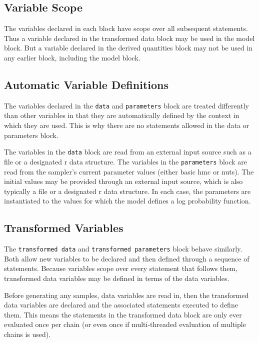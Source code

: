 \documentclass[10pt]{report}
\newcommand{\acronym}[1]{{\sc #1}\xspace}
\newcommand{\R}{\acronym{r}}
\newcommand{\HMC}{\acronym{hmc}}
\newcommand{\NUTS}{\acronym{nuts}}
\newcommand{\code}[1]{{\tt #1}}
\begin{document}
\subsection{Variable Scope}

The variables declared in each block have scope over all subsequent
statements.  Thus a variable declared in the transformed data block
may be used in the model block.  But a variable declared in the
derived quantities block may not be used in any earlier block,
including the model block.

\subsection{Automatic Variable Definitions}

The variables declared in the \code{data} and \code{parameters} block
are treated differently than other variables in that they are
automatically defined by the context in which they are used.  This is
why there are no statements allowed in the data or parameters block.

The variables in the \code{data} block are read from an external input
source such as a file or a designated \R data structure.  The
variables in the \code{parameters} block are read from the sampler's
current parameter values (either basic \HMC or \NUTS).  The initial
values may be provided through an external input source, which is also
typically a file or a designated \R data structure.  In each case, the
parameters are instantiated to the values for which the model defines
a log probability function.

\subsection{Transformed Variables}

The \code{transformed data} and \code{transformed parameters} block
behave similarly.  Both allow new variables to be declared and then
defined through a sequence of statements.  Because variables scope
over every statement that follows them, transformed data variables may
be defined in terms of the data variables.  

Before generating any samples, data variables are read in, then the
transformed data variables are declared and the associated statements
executed to define them.  This means the statements in the transformed
data block are only ever evaluated once per chain (or even once if
multi-threaded evaluation of multiple chains is used).
\end{document}
